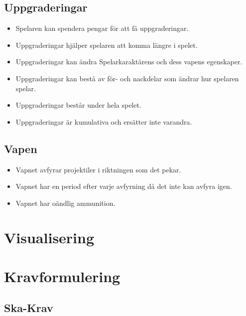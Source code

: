 \documentclass{TDP005mall}
\begin{document}
\subsection{Uppgraderingar}
\begin{itemize}
\item Spelaren kan spendera pengar för att få uppgraderingar.
\item Uppgraderingar hjälper spelaren att komma längre i spelet.
\item Uppgraderingar kan ändra Spelarkaraktärens och dess vapens egenskaper.
\item Uppgraderingar kan bestå av för- och nackdelar som ändrar hur spelaren spelar.
\item Uppgraderingar består under hela spelet.
\item Uppgraderingar är kumulativa och ersätter inte varandra.
\end{itemize}

\subsection{Vapen}
\begin{itemize}
\item Vapnet avfyrar projektiler i riktningen som det pekar.
\item Vapnet har en period efter varje avfyrning då det inte kan avfyra igen.
\item Vapnet har oändlig ammunition.
\end{itemize}

\section{Visualisering}


\section{Kravformulering}

\subsection{Ska-Krav}
\end{document}
